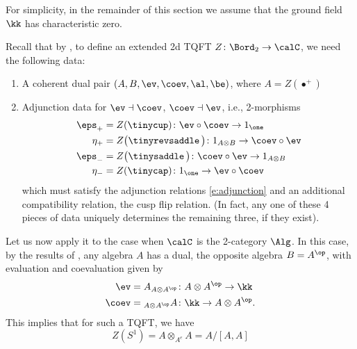 For simplicity, in the remainder of this section we assume that the ground
field $\kk$ has characteristic zero.


Recall that by , to define an
extended 2d TQFT $Z\colon \Bord_2\to \calC$, we need the following data:
\begin{enumerate}
  \item A coherent dual pair $(A,B, \ev, \coev, \al, \be)$, where
  $A=Z(\bullet^+)$

  \item Adjunction data for $\ev\dashv \coev$, $\coev\dashv \ev$, i.e.,
  2-morphisms
  \begin{align*}
    \eps_+ & = Z(\tinycup)\colon \ev\circ \coev \to 1_{\one}\\
    \eta_+ &= Z\bigl(\tinyrevsaddle \,\bigr)\colon
    1_{A\otimes B} \to \coev\circ \ev \\
    \eps_- & = Z\bigl(\tinysaddle\, \bigr)\colon
    \coev\circ \ev \to 1_{A\otimes B}\\
    \eta_- & = Z(\tinycap)\colon   1_\one \to \ev\circ \coev
  \end{align*}
  which must satisfy the adjunction relations \eqref{e:adjunction} and an
  additional compatibility relation, the cusp flip relation.
  (In fact, any one of these 4 pieces of data uniquely determines the
  remaining three, if they exist).
\end{enumerate}


Let us now apply it to the case when $\calC$ is the 2-category $\Alg$.
In this case, by the results of , any algebra $A$ has a dual,
the opposite algebra $B=A^\op$, with evaluation and coevaluation given by
\begin{align*}
  \ev &= A_{A\otimes A^\op} \colon A\otimes A^\op\to \kk\\
  \coev &= {}_{A\otimes A^\op} A \colon \kk \to A\otimes A^\op.
\end{align*}
This implies that for such a TQFT, we have
$$
Z(S^1)=A\otimes_{A^e} A =A/[A,A]
$$

